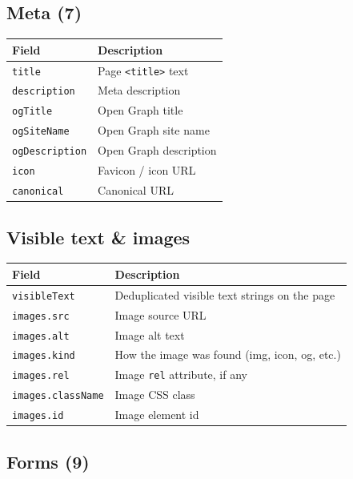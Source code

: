 \documentclass[11pt,a4paper]{article}
\begin{document}
\subsection{Meta (7)}

\begin{tabular}{@{}p{3.8cm}p{9.4cm}@{}}
  \toprule
  \textbf{Field} & \textbf{Description} \\
  \midrule
  \texttt{title} & Page \texttt{<title>} text \\
  \texttt{description} & Meta description \\
  \texttt{ogTitle} & Open Graph title \\
  \texttt{ogSiteName} & Open Graph site name \\
  \texttt{ogDescription} & Open Graph description \\
  \texttt{icon} & Favicon / icon URL \\
  \texttt{canonical} & Canonical URL \\
  \bottomrule
\end{tabular}

\subsection{Visible text \& images}

\begin{tabular}{@{}p{3.8cm}p{9.4cm}@{}}
  \toprule
  \textbf{Field} & \textbf{Description} \\
  \midrule
  \texttt{visibleText} & Deduplicated visible text strings on the page \\
  \texttt{images.src} & Image source URL \\
  \texttt{images.alt} & Image alt text \\
  \texttt{images.kind} & How the image was found (img, icon, og, etc.) \\
  \texttt{images.rel} & Image \texttt{rel} attribute, if any \\
  \texttt{images.className} & Image CSS class \\
  \texttt{images.id} & Image element id \\
  \bottomrule
\end{tabular}

\subsection{Forms (9)}
\end{document}

